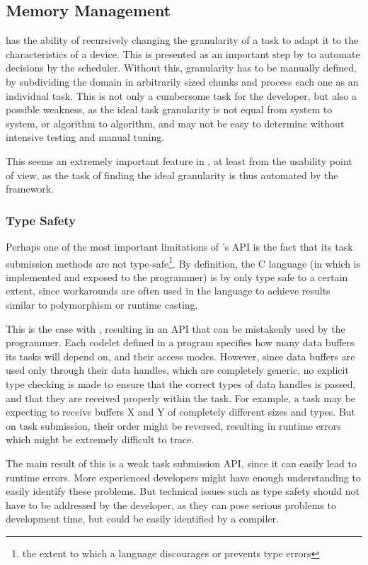 \documentclass[main.tex]{subfiles}
\begin{document}
\subsection{Memory Management}

\gama has the ability of recursively changing the granularity of a task to adapt it to the characteristics of a device. This is presented as an important step by \gama to automate decisions by the scheduler. Without this, granularity has to be manually defined, by subdividing the domain in arbitrarily sized chunks and process each one as an individual task. This is not only a cumbersome task for the developer, but also a possible weakness, as the ideal task granularity is not equal from system to system, or algorithm to algorithm, and may not be easy to determine without intensive testing and manual tuning.

This seems an extremely important feature in \gama, at least from the usability point of view, as the task of finding the ideal granularity is thus automated by the framework.

\subsubsection{Type Safety} \label{sec:comparison:type_safety}

Perhaps one of the most important limitations of \starpu's API is the fact that its task submission methods are not type-safe\footnote{the extent to which a language discourages or prevents type errors}. By definition, the C language (in which \starpu is implemented and exposed to the programmer) is by only type safe to a certain extent, since workarounds are often used in the language to achieve results similar to polymorphism or runtime casting.

This is the case with \starpu, resulting in an API that can be mistakenly used by the programmer. Each codelet defined in a program specifies how many data buffers its tasks will depend on, and their access modes. However, since data buffers are used only through their data handles, which are completely generic, no explicit type checking is made to ensure that the correct types of data handles is passed, and that they are received properly within the task. For example, a task may be expecting to receive buffers X and Y of completely different sizes and types. But on task submission, their order might be reversed, resulting in runtime errors which might be extremely difficult to trace.

The main result of this is a weak task submission API, since it can easily lead to runtime errors. More experienced developers might have enough understanding to easily identify these problems. But technical issues such as type safety should not have to be addressed by the developer, as they can pose serious problems to development time, but could be easily identified by a compiler.
\end{document}
